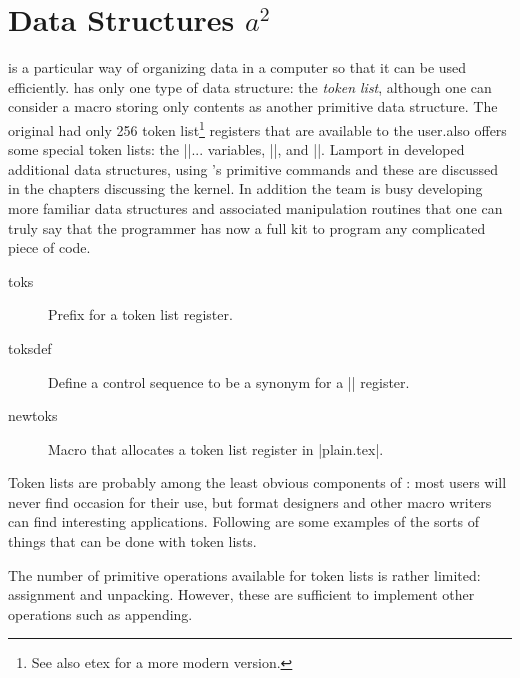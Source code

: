 \chapter[Datat Structures]{Data Structures $a^2$}

 is a particular way of organizing data in a computer so that it can be
used efficiently. \tex has only one type of data structure: the \emph{token list}, although one can consider a macro storing only contents as another primitive data structure. The original \tex had only 256 token list\footnote{See also etex for a more modern version.} registers that are
available to the user.\tex also offers some special token lists: the |\every|... variables, |\errhelp|,
and |\output|. Lamport in \latex developed additional data structures, using \tex’s primitive commands and  these are discussed in the chapters discussing the \latex kernel. In addition the  team is busy developing more familiar data structures and associated manipulation routines that one can truly say that the \tex programmer has now a full kit to program any complicated piece of code.



\begin{description}
\item [toks] Prefix for a token list register.
\item [toksdef]  Define a control sequence to be a synonym for a |\toks| register.
\item [newtoks] Macro that allocates a token list register in |plain.tex|.
\end{description}


Token lists are probably among the least obvious components of \tex: most \tex users will never
find occasion for their use, but format designers and other macro writers can find interesting
applications. Following are some examples of the sorts of things that can be done with token lists.

The number of primitive operations available for token lists is rather limited: assignment and
unpacking. However, these are sufficient to implement other operations such as appending.

